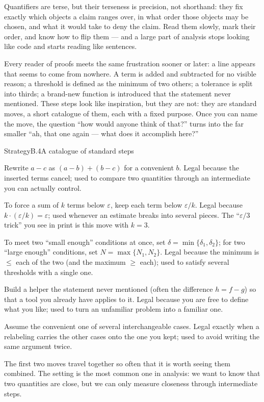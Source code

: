 \documentclass[a4paper,12pt,oneside]{memoir}
\begin{document}
Quantifiers are terse, but their terseness is precision, not shorthand: they fix exactly which objects a claim ranges over, in what order those objects may be chosen, and what it would take to deny the claim. Read them slowly, mark their order, and know how to flip them — and a large part of analysis stops looking like code and starts reading like sentences.


Every reader of proofs meets the same frustration sooner or later: a line appears that seems to come from nowhere. A term is added and subtracted for no visible reason; a threshold is defined as the minimum of two others; a tolerance is split into thirds; a brand-new function is introduced that the statement never mentioned. These steps look like inspiration, but they are not: they are standard moves, a short catalogue of them, each with a fixed purpose. Once you can name the move, the question “how would anyone think of that?” turns into the far smaller “ah, that one again — what does it accomplish here?”

\begin{envstrategy}{Strategy}{B.4}{A catalogue of standard steps}
\begin{bulletsteps}
  \item {} Rewrite \(a - c\) as \((a - b) + (b - c)\) for a convenient \(b\). Legal because the inserted terms cancel; used to compare two quantities through an intermediate you can actually control.
  \item {} To force a sum of \(k\) terms below \(\varepsilon\), keep each term below \(\varepsilon/k\). Legal because \(k \cdot (\varepsilon/k) = \varepsilon\); used whenever an estimate breaks into several pieces. The “\(\varepsilon/3\) trick” you see in print is this move with \(k = 3\).
  \item {} To meet two “small enough” conditions at once, set \(\delta = \min\{\delta_1, \delta_2\}\); for two “large enough” conditions, set \(N = \max\{N_1, N_2\}\). Legal because the minimum is \(\le\) each of the two (and the maximum \(\ge\) each); used to satisfy several thresholds with a single one.
  \item {} Build a helper the statement never mentioned (often the difference \(h = f - g\)) so that a tool you already have applies to it. Legal because you are free to define what you like; used to turn an unfamiliar problem into a familiar one.
  \item {} Assume the convenient one of several interchangeable cases. Legal exactly when a relabeling carries the other cases onto the one you kept; used to avoid writing the same argument twice.
\end{bulletsteps}
\end{envstrategy}
The first two moves travel together so often that it is worth seeing them combined. The setting is the most common one in analysis: we want to know that two quantities are close, but we can only measure closeness through intermediate steps.
\end{document}
